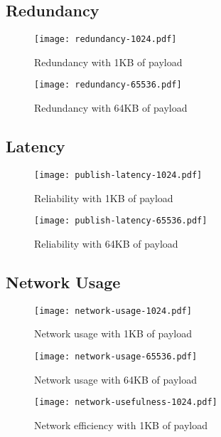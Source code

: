 \documentclass[sigconf]{acmart}
\begin{document}

\subsection{Redundancy}

\begin{figure}[htp]
    \centering
    \texttt{[image: redundancy-1024.pdf]}
    \caption{Redundancy with 1KB of payload}
    \label{fig:redundancy-1024}
\end{figure}

\begin{figure}[htp]
    \centering
    \texttt{[image: redundancy-65536.pdf]}
    \caption{Redundancy with 64KB of payload}
    \label{fig:redundancy-65536}
\end{figure}

\subsection{Latency}

\begin{figure}[htp]
    \centering
    \texttt{[image: publish-latency-1024.pdf]}
    \caption{Reliability with 1KB of payload}
    \label{fig:reliability-1024}
\end{figure}

\begin{figure}[htp]
    \centering
    \texttt{[image: publish-latency-65536.pdf]}
    \caption{Reliability with 64KB of payload}
    \label{fig:reliability-65536}
\end{figure}

\subsection{Network Usage}

\begin{figure}[htp]
    \centering
    \texttt{[image: network-usage-1024.pdf]}
    \caption{Network usage with 1KB of payload}
    \label{fig:reliability-1024}
\end{figure}

\begin{figure}[htp]
    \centering
    \texttt{[image: network-usage-65536.pdf]}
    \caption{Network usage with 64KB of payload}
    \label{fig:reliability-65536}
\end{figure}

\begin{figure}[htp]
    \centering
    \texttt{[image: network-usefulness-1024.pdf]}
    \caption{Network efficiency with 1KB of payload}
    \label{fig:network-efficiency-1024}
\end{figure}
\end{document}
